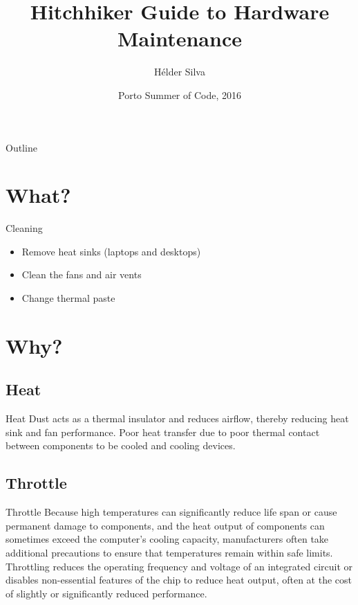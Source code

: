 \documentclass{beamer}
\title{Hitchhiker Guide to Hardware Maintenance}
\author{Hélder Silva}
\date{Porto Summer of Code, 2016}
\begin{document}
\begin{frame}
  \titlepage
\end{frame}

\begin{frame}{Outline}
  \tableofcontents
\end{frame}

\section{What?}

\begin{frame}{Cleaning}
    \begin{itemize}
        \item Remove heat sinks (laptops and desktops)
        \item Clean the fans and air vents
        \item Change thermal paste
    \end{itemize}
\end{frame}

\section{Why?}

\subsection{Heat}
\begin{frame}{Heat}
    Dust acts as a thermal insulator and reduces airflow, thereby reducing heat sink and fan performance.
    \newline
    \newline
    Poor heat transfer due to poor thermal contact between components to be cooled and cooling devices.
\end{frame}

\subsection{Throttle}
\begin{frame}{Throttle}
    Because high temperatures can significantly reduce life span or cause permanent damage to components, and the heat output of components can sometimes exceed the computer's cooling capacity, manufacturers often take additional precautions to ensure that temperatures remain within safe limits.
    \newline
    \newline
    Throttling reduces the operating frequency and voltage of an integrated circuit or disables non-essential features of the chip to reduce heat output, often at the cost of slightly or significantly reduced performance.
\end{frame}
\end{document}
